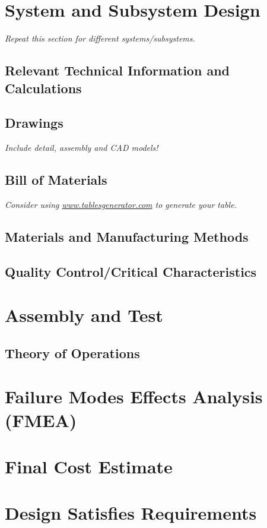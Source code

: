 \documentclass{article}
\begin{document}
\newpage
\section{System and Subsystem Design}
\textit{Repeat this section for different systems/subsystems.}

\subsection{Relevant Technical Information and Calculations}
\subsection{Drawings}
\textit{Include detail, assembly and CAD models!}
\subsection{Bill of Materials}
\textit{Consider using \url{www.tablesgenerator.com} to generate your table.}
\subsection{Materials and Manufacturing Methods}
\subsection{Quality Control/Critical Characteristics}

\newpage
\section{Assembly and Test}

\newpage
\subsection{Theory of Operations}

\newpage
\section{Failure Modes Effects Analysis (FMEA)}

\newpage
\section{Final Cost Estimate}

\newpage
\section{Design Satisfies Requirements}
\end{document}
